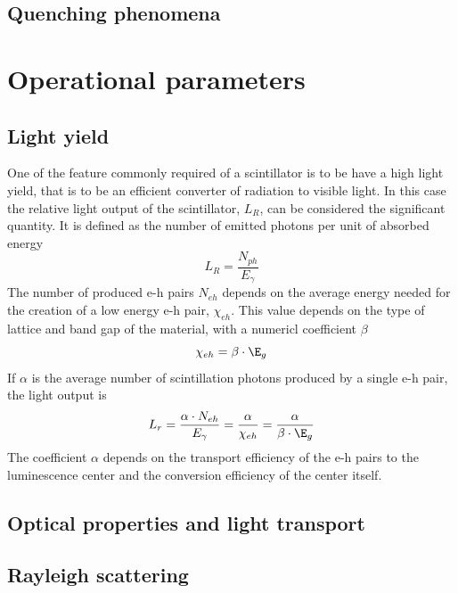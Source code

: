 
\subsection{Quenching phenomena}

\section{Operational parameters}
\subsection{Light yield}
One of the feature commonly required of a scintillator is to be have a high light yield, that is to be an efficient converter of radiation to visible light.
In this case the relative light output of the scintillator, $L_{R}$, can be considered the significant quantity. It is defined as the number of emitted photons per unit of absorbed energy\cite{Rodnyi1997}
\begin{equation}
L_{R} = \frac{N_{ph}}{E_{\gamma}}
\end{equation}
The number of produced e-h pairs $N_{eh}$ depends on the average energy needed for the creation of a low energy e-h pair, $\chi _{eh}$. This value depends on the type of lattice and band gap of the material, with a numericl coefficient $\beta$
\begin{equation}
\chi _{eh} = \beta \cdot \E_{g}
\end{equation}
If $\alpha$ is the average number of scintillation photons produced by a single e-h pair, the light output is
\begin{equation}
L_{r} = \frac{\alpha \cdot N_{eh}}{E_{\gamma}} = \frac{\alpha}{\chi _{eh}} = \frac{\alpha}{\beta \cdot \E_{g}}
\end{equation}
The coefficient $\alpha$ depends on the transport efficiency of the e-h pairs to the luminescence center and the conversion efficiency of the center itself.

\subsection{Optical properties and light transport}
\subsection{Rayleigh scattering}


